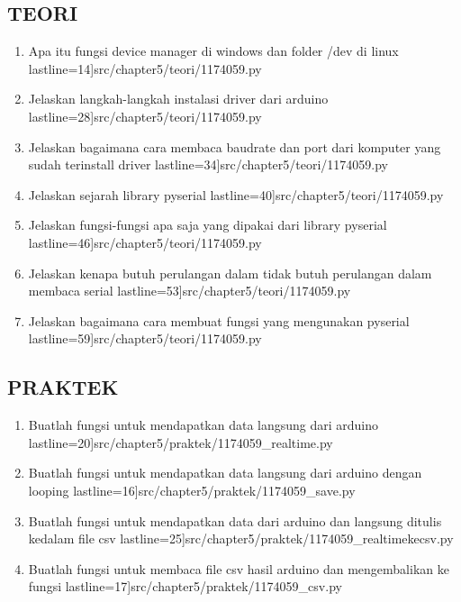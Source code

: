	\subsection {TEORI}
	\begin {enumerate}
		\item  Apa itu fungsi device manager di windows dan folder /dev di linux
			 lastline=14]{src/chapter5/teori/1174059.py}
		\item Jelaskan langkah-langkah instalasi driver dari arduino
			 lastline=28]{src/chapter5/teori/1174059.py}
		\item Jelaskan bagaimana cara membaca baudrate dan port dari komputer yang sudah terinstall driver
			 lastline=34]{src/chapter5/teori/1174059.py}
		\item Jelaskan sejarah library pyserial
			 lastline=40]{src/chapter5/teori/1174059.py}
		\item Jelaskan fungsi-fungsi apa saja yang dipakai dari library pyserial
			 lastline=46]{src/chapter5/teori/1174059.py}
		\item Jelaskan kenapa butuh perulangan dalam tidak butuh perulangan dalam membaca serial
			 lastline=53]{src/chapter5/teori/1174059.py}
		\item Jelaskan bagaimana cara membuat fungsi yang mengunakan pyserial
			 lastline=59]{src/chapter5/teori/1174059.py}
	\end {enumerate}

	\subsection {PRAKTEK}
		\begin {enumerate}
			\item  Buatlah fungsi untuk mendapatkan data langsung dari arduino
				 lastline=20]{src/chapter5/praktek/1174059_realtime.py}
			\item Buatlah fungsi  untuk mendapatkan data langsung dari arduino dengan looping
				 lastline=16]{src/chapter5/praktek/1174059_save.py}
			\item Buatlah fungsi  untuk mendapatkan data dari arduino dan langsung ditulis kedalam file csv
				 lastline=25]{src/chapter5/praktek/1174059_realtimekecsv.py}
			\item Buatlah fungsi  untuk membaca ﬁle csv hasil arduino dan mengembalikan ke fungsi
				 lastline=17]{src/chapter5/praktek/1174059_csv.py}
		\end {enumerate}
		

